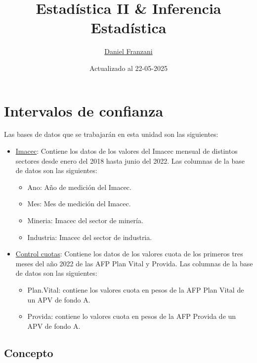 \documentclass[
  11pt,
]{book}
\title{Estadística II \& Inferencia Estadística}
\author{\href{https://dfranzani.github.io/website/principal/home.html}{Daniel Franzani}}
\date{Actualizado al 22-05-2025}
\providecommand{\tightlist}{%
  \setlength{\itemsep}{0pt}\setlength{\parskip}{0pt}}
\theoremstyle{definition}
\theoremstyle{definition}
\theoremstyle{definition}
\theoremstyle{definition}
\theoremstyle{remark}
\begin{document}
\maketitle

{
\setcounter{tocdepth}{3}
\tableofcontents
}
\chapter{Intervalos de confianza}\label{intervalos-de-confianza}

Las bases de datos que se trabajarán en esta unidad son las siguientes:

\begin{itemize}
\item
  \label{Imacec1}\href{https://raw.githubusercontent.com/Dfranzani/Bases-de-datos-para-cursos/main/2022-2/Estad\%C3\%ADstica\%201/imacec.csv}{Imacec}: Contiene los datos de los valores del Imacec mensual de distintos sectores desde enero del 2018 hasta junio del 2022. Las columnas de la base de datos son las siguientes:

  \begin{itemize}
  \tightlist
  \item
    Ano: Año de medición del Imacec.
  \item
    Mes: Mes de medición del Imacec.
  \item
    Mineria: Imacec del sector de minería.
  \item
    Industria: Imacec del sector de industria.
  \end{itemize}
\item
  \label{Cuotas}\href{https://raw.githubusercontent.com/Dfranzani/Bases-de-datos-para-cursos/main/2023-1/control\%2Bcuotas.csv}{Control cuotas}: Contiene los datos de los valores cuota de los primeros tres meses del año 2022 de las AFP Plan Vital y Provida. Las columnas de la base de datos son las siguientes:

  \begin{itemize}
  \tightlist
  \item
    Plan.Vital: contiene los valores cuota en pesos de la AFP Plan Vital de un APV de fondo A.
  \item
    Provida: contiene lo valores cuota en pesos de la AFP Provida de un APV de fondo A.
  \end{itemize}
\end{itemize}

\section{Concepto}\label{concepto}
\end{document}
